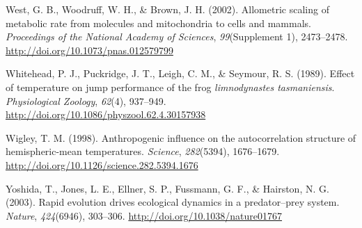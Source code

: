 \documentclass[12pt,twoside]{reedthesis}
\begin{document}
\leavevmode\hypertarget{ref-west_allometric_2002}{}%
West, G. B., Woodruff, W. H., \& Brown, J. H. (2002). Allometric scaling of metabolic rate from molecules and mitochondria to cells and mammals. \emph{Proceedings of the National Academy of Sciences}, \emph{99}(Supplement 1), 2473--2478. \url{http://doi.org/10.1073/pnas.012579799}

\leavevmode\hypertarget{ref-whitehead_effect_1989}{}%
Whitehead, P. J., Puckridge, J. T., Leigh, C. M., \& Seymour, R. S. (1989). Effect of temperature on jump performance of the frog \emph{limnodynastes tasmaniensis}. \emph{Physiological Zoology}, \emph{62}(4), 937--949. \url{http://doi.org/10.1086/physzool.62.4.30157938}

\leavevmode\hypertarget{ref-wigley_anthropogenic_1998-1}{}%
Wigley, T. M. (1998). Anthropogenic influence on the autocorrelation structure of hemispheric-mean temperatures. \emph{Science}, \emph{282}(5394), 1676--1679. \url{http://doi.org/10.1126/science.282.5394.1676}

\leavevmode\hypertarget{ref-yoshida_rapid_2003}{}%
Yoshida, T., Jones, L. E., Ellner, S. P., Fussmann, G. F., \& Hairston, N. G. (2003). Rapid evolution drives ecological dynamics in a predator--prey system. \emph{Nature}, \emph{424}(6946), 303--306. \url{http://doi.org/10.1038/nature01767}


\end{document}

